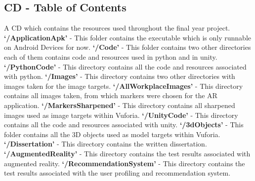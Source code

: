 \documentclass{aifyp}
\begin{document}
\begin{appendices}
\section{CD - Table of Contents}
A CD which contains the resources used throughout the final year project.
\newline
\newline
\textbf{`/ApplicationApk'} - This folder contains the executable which is only runnable on Android Devices for now.
\newline
\newline
\textbf{`/Code'} - This folder contains two other directories each of them contains code and resources used in python and in unity.
\newline
\newline
\textbf{`/PythonCode'} - This directory contains all the code and resources associated with python.
\newline
\newline
\textbf{`/Images'} - This directory contains two other directories with images taken for the image targets.
\newline
\newline
\textbf{`/AllWorkplaceImages'} - This directory contains all images taken, from which markers were chosen for the AR application.
\newline
\newline
\textbf{`/MarkersSharpened'} - This directory contains all sharpened images used as image targets within Vuforia.
\newline
\newline
\textbf{`/UnityCode'} - This directory contains all the code and resources associated with unity.
\newline
\newline
\textbf{`/3dObjects'} - This folder contains all the 3D objects used as model targets within Vuforia.
\newline
\newline
\textbf{`/Dissertation'} - This directory contains the written dissertation.
\newline
\newline
\textbf{`/AugmentedReality'} - This directory contains the test results associated with augmented reality.
\newline
\newline
\textbf{`/RecommendationSystem'} - This directory contains the test results associated with the user profiling and recommendation system.
\newline

\end{appendices}
\end{document}
